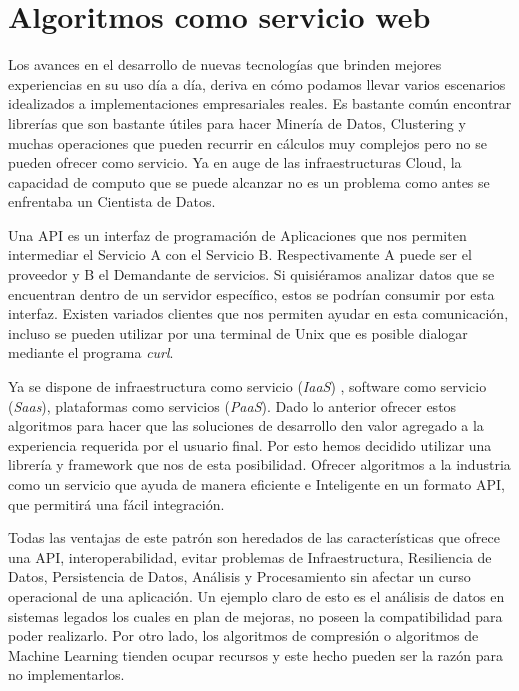 \section{Algoritmos como servicio web }

	Los avances en el desarrollo de nuevas tecnologías que brinden mejores experiencias en su uso día a día, deriva en cómo podamos llevar varios escenarios idealizados a implementaciones empresariales reales. Es bastante común encontrar librerías que son bastante útiles para hacer Minería de Datos, Clustering y muchas operaciones que pueden recurrir en cálculos muy complejos pero no se pueden ofrecer como servicio. Ya en auge de las infraestructuras Cloud, la capacidad de computo que se puede alcanzar no es un problema como antes se enfrentaba un Cientista de Datos.


	Una API es un interfaz de programación de Aplicaciones que nos permiten intermediar el Servicio A con el Servicio B. Respectivamente A puede ser el proveedor y B el Demandante de servicios. Si quisiéramos analizar datos que se encuentran dentro de un servidor específico, estos se podrían consumir por esta interfaz. Existen variados clientes que nos permiten ayudar en esta comunicación, incluso se pueden utilizar por una terminal de Unix que es posible dialogar mediante el programa \emph{curl}.
	
	Ya se dispone de infraestructura como servicio (\emph{IaaS}) , software como servicio (\emph{Saas}), plataformas como servicios (\emph{PaaS}). Dado lo anterior ofrecer estos algoritmos para hacer que las soluciones de desarrollo den valor agregado a la experiencia requerida por el usuario final. Por esto hemos decidido utilizar una librería y framework que nos de esta posibilidad. Ofrecer algoritmos a la industria como un servicio que ayuda de manera eficiente e Inteligente en un formato API, que permitirá una fácil integración. 
	
	Todas las ventajas de este patrón son heredados de las características que ofrece una API, interoperabilidad, evitar problemas de Infraestructura, Resiliencia de Datos, Persistencia de Datos, Análisis y Procesamiento sin afectar un curso operacional de una aplicación. Un ejemplo claro de esto es el análisis de datos en sistemas legados los cuales en plan de mejoras, no poseen la compatibilidad para poder realizarlo. Por otro lado, los algoritmos de compresión o algoritmos de Machine Learning tienden ocupar recursos y este hecho pueden ser la razón para no implementarlos. 
	
	
	
	